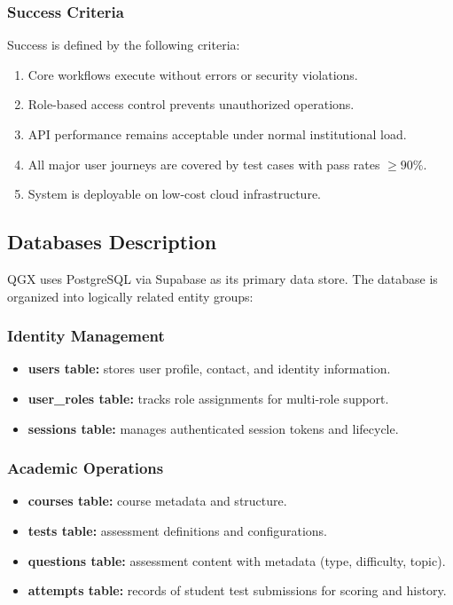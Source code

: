 \documentclass[11pt,a4paper]{article}
\begin{document}
\subsubsection{Success Criteria}

Success is defined by the following criteria:

\begin{enumerate}
    \item Core workflows execute without errors or security violations.
    \item Role-based access control prevents unauthorized operations.
    \item API performance remains acceptable under normal institutional load.
    \item All major user journeys are covered by test cases with pass rates $\geq 90\%$.
    \item System is deployable on low-cost cloud infrastructure.
\end{enumerate}

\subsection{Databases Description}

QGX uses PostgreSQL via Supabase as its primary data store. The database is organized into logically related entity groups:

\subsubsection{Identity Management}

\begin{itemize}
    \item \textbf{users table:} stores user profile, contact, and identity information.
    \item \textbf{user\_roles table:} tracks role assignments for multi-role support.
    \item \textbf{sessions table:} manages authenticated session tokens and lifecycle.
\end{itemize}

\subsubsection{Academic Operations}

\begin{itemize}
    \item \textbf{courses table:} course metadata and structure.
    \item \textbf{tests table:} assessment definitions and configurations.
    \item \textbf{questions table:} assessment content with metadata (type, difficulty, topic).
    \item \textbf{attempts table:} records of student test submissions for scoring and history.
\end{itemize}
\end{document}
